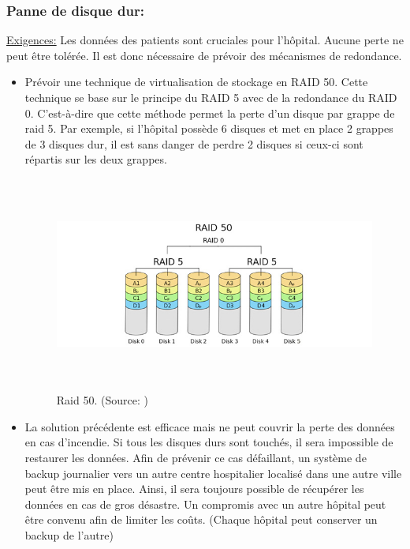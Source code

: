 \documentclass[12pt]{article}
\begin{document}
\subsubsection{Panne de disque dur:} \label{panne-disque}
\justify
\underline{Exigences:} Les données des patients sont cruciales pour l'hôpital. Aucune perte ne peut être tolérée. Il est donc nécessaire de prévoir des mécanismes de redondance.
\begin{itemize} 
	\item Prévoir une technique de virtualisation de stockage en RAID 50. Cette technique se base sur le principe du RAID 5 avec de la redondance du RAID 0\cite{raid}. C'est-à-dire que cette méthode permet la perte d'un disque par grappe de raid 5. Par exemple, si l'hôpital possède 6 disques et met en place 2 grappes de 3 disques dur, il est sans danger de perdre 2 disques si ceux-ci sont répartis sur les deux grappes.
	\begin{figure}[H]
	\includegraphics[width=\textwidth,height=200pt]{assets/raid-50.jpg} 
	\caption[Raid 50]{Raid 50. (Source: \cite{raid})}
	\label{fig:raid50}
	\end{figure}

	\item La solution précédente est efficace mais ne peut couvrir la perte des données en cas d'incendie. Si tous les disques durs sont touchés, il sera impossible de restaurer les données. Afin de prévenir ce cas défaillant, un système de backup journalier vers un autre centre hospitalier localisé dans une autre ville peut être mis en place. Ainsi, il sera toujours possible de récupérer les données en cas de gros désastre. Un compromis avec un autre hôpital peut être convenu afin de limiter les coûts. (Chaque hôpital peut conserver un backup de l'autre)
\end{itemize}
\end{document}
